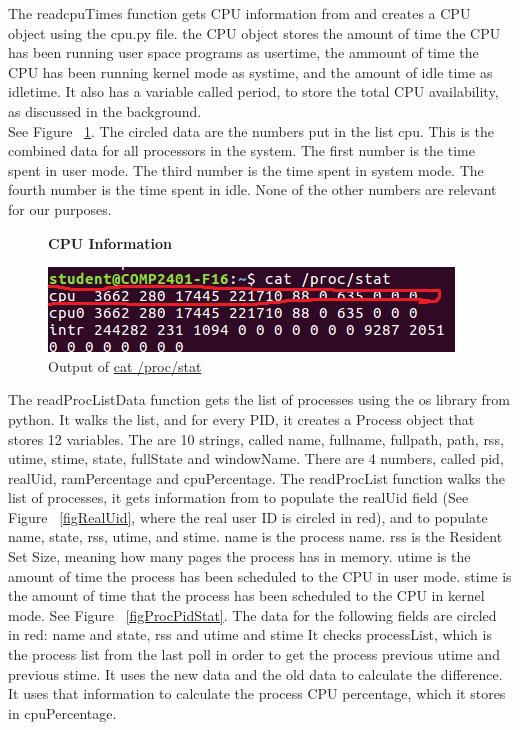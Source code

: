 \documentclass[12pt]{article}
\begin{document}
The readcpuTimes function gets CPU information from  and creates a CPU object using the cpu.py file. the CPU object stores the amount of time the CPU has been running user space programs as usertime, the ammount of time the CPU has been running kernel mode as systime, and the amount of idle time as idletime.
It also has a variable called period, to store the total CPU availability, as discussed in the background.\\
See Figure ~\ref{figCPUInfo}.
The circled data are the numbers put in the list cpu.
This is the combined data for all processors in the system.
The first number is the time spent in user mode.
The third number is the time spent in system mode.
The fourth number is the time spent in idle.
None of the other numbers are relevant for our purposes.\\
\begin{figure}[h]
	\centering
	\textbf{CPU Information}\par\medskip
	\includegraphics{totalCPU}
	\caption{Output of \url{cat /proc/stat}}
	\label{figCPUInfo}
\end{figure}
The readProcListData function gets the list of processes using the os library from python. It walks the list, and for every PID, it creates a Process object that stores 12 variables. The are 10 strings, called name, fullname, fullpath, path, rss, utime, stime, state, fullState and windowName. There are 4 numbers, called pid, realUid, ramPercentage and cpuPercentage. The readProcList function walks the list of processes, it gets information from  to populate the realUid field (See Figure ~\ref{figRealUid}, where the real user ID is circled in red), and  to populate name, state, rss, utime, and stime. name is the process name. rss is the Resident Set Size, meaning how many pages the process has in memory. utime is the amount of time the process has been scheduled to the CPU in user mode. stime is the amount of time that the process has been scheduled to the CPU in kernel mode. See Figure ~\ref{figProcPidStat}. The data for the following fields are circled in red: name and state, rss and utime and stime It checks processList, which is the process list from the last poll in order to get the process previous utime and previous stime. It uses the new data and the old data to calculate the difference. It uses that information to calculate the process CPU percentage, which it stores in cpuPercentage. 
\end{document}
